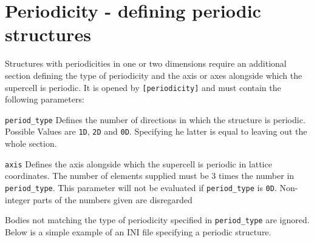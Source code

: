 \section{Periodicity - defining periodic structures}
Structures with periodicities in one or two dimensions require an additional section defining the type of periodicity and the axis or axes alongside which the supercell is periodic. It is opened by \lstinline{[periodicity]} and must contain the following parameters:
\begin{description}
 \item{\lstinline{period_type}} Defines the number of directions in which the structure is periodic. Possible Values are \lstinline{1D}, \lstinline{2D} and \lstinline{0D}. Specifying he latter is equal to leaving out the whole section.
 \item{\lstinline{axis}} Defines the axis alongside which the supercell is periodic in lattice coordinates. The number of elements supplied must be 3 times the number in \lstinline{period_type}. This parameter will not be evaluated if \lstinline{period_type} is \lstinline{0D}. Non-integer parts of the numbers given are disregarded
\end{description}

Bodies not matching the type of periodicity specified in \lstinline{period_type} are ignored. Below is a simple example of an INI file specifying a periodic structure.

